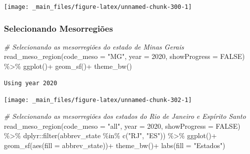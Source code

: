 \documentclass[
  brazilian,
]{book}
\newenvironment{Shaded}{\begin{snugshade}}{\end{snugshade}}
\newcommand{\AttributeTok}[1]{\textcolor[rgb]{0.77,0.63,0.00}{#1}}
\newcommand{\CommentTok}[1]{\textcolor[rgb]{0.56,0.35,0.01}{\textit{#1}}}
\newcommand{\ConstantTok}[1]{\textcolor[rgb]{0.00,0.00,0.00}{#1}}
\newcommand{\DecValTok}[1]{\textcolor[rgb]{0.00,0.00,0.81}{#1}}
\newcommand{\FunctionTok}[1]{\textcolor[rgb]{0.00,0.00,0.00}{#1}}
\newcommand{\NormalTok}[1]{#1}
\newcommand{\SpecialCharTok}[1]{\textcolor[rgb]{0.00,0.00,0.00}{#1}}
\newcommand{\StringTok}[1]{\textcolor[rgb]{0.31,0.60,0.02}{#1}}
\begin{document}
\begin{center}\texttt{[image: \_main\_files/figure-latex/unnamed-chunk-300-1]} \end{center}

\hypertarget{selecionando-mesorregiuxf5es}{%
\subsubsection{Selecionando Mesorregiões}\label{selecionando-mesorregiuxf5es}}

\begin{Shaded}
\begin{Highlighting}[]
\CommentTok{\# Selecionando as mesorregiões do estado de Minas Gerais}
\FunctionTok{read\_meso\_region}\NormalTok{(}\AttributeTok{code\_meso =} \StringTok{"MG"}\NormalTok{,}
                 \AttributeTok{year =} \DecValTok{2020}\NormalTok{,}
                 \AttributeTok{showProgress =} \ConstantTok{FALSE}\NormalTok{) }\SpecialCharTok{\%\textgreater{}\%}
  \FunctionTok{ggplot}\NormalTok{()}\SpecialCharTok{+}
  \FunctionTok{geom\_sf}\NormalTok{()}\SpecialCharTok{+}
  \FunctionTok{theme\_bw}\NormalTok{()}
\end{Highlighting}
\end{Shaded}

\begin{verbatim}
Using year 2020
\end{verbatim}

\begin{center}\texttt{[image: \_main\_files/figure-latex/unnamed-chunk-302-1]} \end{center}

\begin{Shaded}
\begin{Highlighting}[]
\CommentTok{\# Selecionando as mesorregiões dos estados do Rio de Janeiro e Espírito Santo}
\FunctionTok{read\_meso\_region}\NormalTok{(}\AttributeTok{code\_meso =} \StringTok{"all"}\NormalTok{,}
                 \AttributeTok{year =} \DecValTok{2020}\NormalTok{,}
                 \AttributeTok{showProgress =} \ConstantTok{FALSE}\NormalTok{) }\SpecialCharTok{\%\textgreater{}\%} 
\NormalTok{  dplyr}\SpecialCharTok{::}\FunctionTok{filter}\NormalTok{(abbrev\_state }\SpecialCharTok{\%in\%} \FunctionTok{c}\NormalTok{(}\StringTok{"RJ"}\NormalTok{, }\StringTok{"ES"}\NormalTok{)) }\SpecialCharTok{\%\textgreater{}\%} 
  \FunctionTok{ggplot}\NormalTok{()}\SpecialCharTok{+}
  \FunctionTok{geom\_sf}\NormalTok{(}\FunctionTok{aes}\NormalTok{(}\AttributeTok{fill =}\NormalTok{ abbrev\_state))}\SpecialCharTok{+}
  \FunctionTok{theme\_bw}\NormalTok{()}\SpecialCharTok{+}
  \FunctionTok{labs}\NormalTok{(}\AttributeTok{fill =} \StringTok{"Estados"}\NormalTok{)}
\end{Highlighting}
\end{Shaded}
\end{document}
